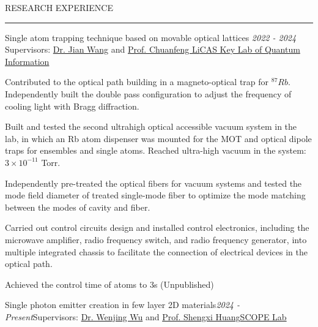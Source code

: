 \documentclass{resume} %
\renewenvironment{rSection}[1]{
\sectionskip
\textcolor{CarnegieMellonRed}{\MakeUppercase{#1}}
\sectionlineskip
\hrule
\begin{list}{}{
\setlength{\leftmargin}{1.5em}
}
\item[]
}{
\end{list}
}
\begin{document}
\begin{rSection}{Research Experience}
\vspace{2pt}
\begin{rSubsection}{Single atom trapping technique based on movable optical lattices }{\textit{2022 - 2024}}{ Supervisors: \href{https://faculty.ustc.edu.cn/wangjian1}{Dr. Jian Wang} and \href{http://lqcc.ustc.edu.cn/cfli/}{Prof. Chuanfeng Li}}{\href{https://lqcc.ustc.edu.cn/}{CAS Key Lab of Quantum Information}}
\begin{spacing}{1.0}
\item Contributed to the optical path building in a magneto-optical trap for $^{87}Rb$. Independently built the double pass configuration to adjust the frequency of cooling light with Bragg diffraction.
\vspace{3pt}
\item Built and tested the second ultrahigh optical accessible vacuum system in the lab, in which an Rb atom dispenser was mounted for the MOT and optical dipole traps for ensembles and single atoms. Reached ultra-high vacuum in the system: $3\times10^{-11}$ Torr.
\vspace{3pt}
\item Independently pre-treated the optical fibers for vacuum systems and tested the mode field diameter of treated single-mode fiber to optimize the mode matching between the modes of cavity and fiber.
\vspace{3pt}
\item Carried out control circuits design and installed control electronics, including the microwave amplifier, radio frequency switch, and radio frequency generator, into multiple integrated chassis to facilitate the connection of electrical devices in the optical path.
\vspace{3pt}
\item Achieved the control time of atoms to 3s (Unpublished)
\end{spacing}
\end{rSubsection}
\vspace{-5pt}
\begin{rSubsection}{Single photon emitter creation in few layer 2D materials}{\textit{2024 - Present}}{Supervisors: \href{https://scholar.google.com/citations?user=lm68m7kAAAAJ&hl=en}{Dr. Wenjing Wu} and \href{https://profiles.rice.edu/faculty/shengxi-huang}{Prof. Shengxi Huang}}{\href{https://scopelab.rice.edu/}{SCOPE Lab}}


\end{rSubsection}
\end{rSection}
\end{document}
